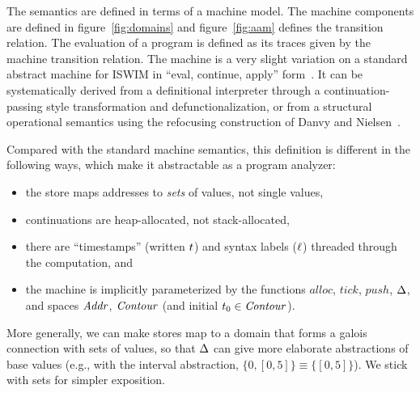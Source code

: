 \documentclass[preprint,onecolumn,9pt]{sigplanconf} %
\begin{document}
The semantics are defined in terms of a machine model.  The machine
components are defined in figure~\ref{fig:domains} and
figure~\ref{fig:aam} defines the transition relation.  The evaluation
of a program is defined as its traces given by the machine transition relation.  The
machine is a very slight variation on a standard abstract machine for
ISWIM in ``eval, continue, apply'' form~\cite{dvanhorn:Danvy:DSc}.  It
can be systematically derived from a definitional interpreter through
a continuation-passing style transformation and defunctionalization,
or from a structural operational semantics using the refocusing
construction of Danvy and
Nielsen~\cite{dvanhorn:Danvy-Nielsen:RS-04-26}.

Compared with the standard machine semantics, this definition is
different in the following ways, which make it abstractable as a
program analyzer:
\begin{itemize}
\item the store maps addresses to \emph{sets} of values, not
  single values,
\item continuations are heap-allocated, not stack-allocated,
\item there are ``timestamps'' (written ${t}$) and syntax
  labels (${\ell}$) threaded through the computation, and
\item the machine is implicitly parameterized by the functions
  $\mathit{alloc}$, $\mathit{tick}$,
  $\mathit{push}$, $\Delta$, and spaces
  $\mathit{Addr}$, $\mathit{Contour}$ (and initial ${t}_0 \in \mathit{Contour}$).
\end{itemize}

More generally, we can make stores map to a domain that forms a galois
connection with sets of values, so that $\Delta$ can give more
elaborate abstractions of base values (e.g., with the interval
abstraction, $\{0,[0,5]\} \equiv \{[0,5]\}$). We stick with sets for
simpler exposition.
\end{document}
